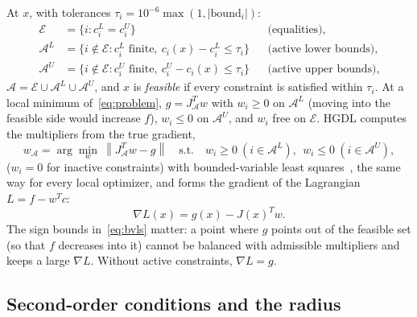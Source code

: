 \documentclass[11pt]{article}
\newcommand{\norm}[1]{\left\lVert #1 \right\rVert}
\begin{document}
At $x$, with tolerances $\tau_i = 10^{-6}\max(1, |\text{bound}_i|)$:
\begin{align*}
  \mathcal{E} &= \{i : c^L_i = c^U_i\} && \text{(equalities)},\\
  \mathcal{A}^L &= \{i \notin \mathcal{E} : c^L_i \text{ finite},\ c_i(x) - c^L_i \le \tau_i\}
     && \text{(active lower bounds)},\\
  \mathcal{A}^U &= \{i \notin \mathcal{E} : c^U_i \text{ finite},\ c^U_i - c_i(x) \le \tau_i\}
     && \text{(active upper bounds)},
\end{align*}
$\mathcal{A} = \mathcal{E} \cup \mathcal{A}^L \cup \mathcal{A}^U$, and $x$ is \emph{feasible}
if every constraint is satisfied within $\tau_i$. At a local minimum of~\eqref{eq:problem},
$g = J_{\mathcal{A}}^T w$ with $w_i \ge 0$ on $\mathcal{A}^L$ (moving into the feasible side
would increase $f$), $w_i \le 0$ on $\mathcal{A}^U$, and $w_i$ free on $\mathcal{E}$. HGDL
computes the multipliers from the true gradient,
\begin{equation}\label{eq:bvls}
  w_{\mathcal{A}} = \arg\min_{w}\ \norm{J_{\mathcal{A}}^T w - g}
  \quad\text{s.t.}\quad w_i \ge 0\ (i\in\mathcal{A}^L),\ \ w_i \le 0\ (i\in\mathcal{A}^U),
\end{equation}
($w_i = 0$ for inactive constraints) with bounded-variable least squares~\cite{stark1995}, the
same way for every local optimizer, and forms the gradient of the Lagrangian
$L = f - w^T c$:
\begin{equation}\label{eq:gradL}
  \nabla L(x) = g(x) - J(x)^T w .
\end{equation}
The sign bounds in~\eqref{eq:bvls} matter: a point where $g$ points out of the feasible set
(so that $f$ decreases into it) cannot be balanced with admissible multipliers and keeps a
large $\nabla L$. Without active constraints, $\nabla L = g$.

\subsection{Second-order conditions and the radius}
\end{document}
